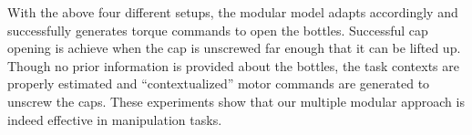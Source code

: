 With the above four different setups, the modular model adapts
accordingly and successfully generates torque commands to open the
bottles. Successful cap opening is achieve when the cap is unscrewed
far enough that it can be lifted up. Though no prior information is
provided about the bottles, the task contexts are properly estimated
and ``contextualized'' motor commands are generated to unscrew the
caps. These experiments show that our multiple modular approach is
indeed effective in manipulation tasks. %



